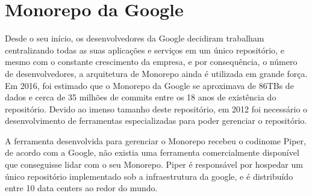 \section{Monorepo da Google}

Desde o seu início, os desenvolvedores da Google decidiram trabalham centralizando todas as suas aplicações e serviços em um único repositório, e mesmo com o constante crescimento da empresa, e por consequência, o número de desenvolvedores, a arquitetura de Monorepo ainda é utilizada em grande força. Em 2016, foi estimado que o Monorepo da Google se aproximava de 86TBs de dados e cerca de 35 milhões de commits entre os 18 anos de existência do repositório. Devido ao imenso tamanho deste repositório, em 2012 foi necessário o desenvolvimento de ferramentas especializadas para poder gerenciar o repositório. 

A ferramenta desenvolvida para gerenciar o Monorepo recebeu o codinome Piper, de acordo com a Google, não existia uma ferramenta comercialmente disponível que conseguisse lidar com o seu Monorepo. Piper é responsável por hospedar um único repositório implementado sob a infraestrutura da google, e é distribuído entre 10 data centers ao redor do mundo. 